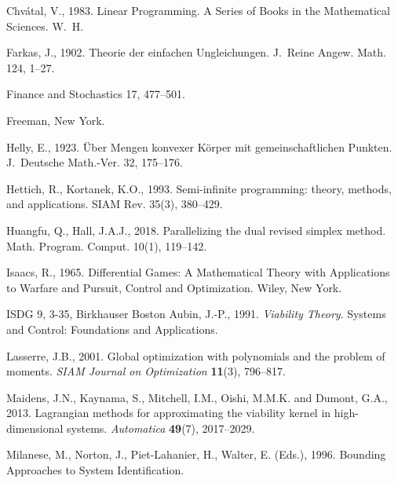 \documentclass[10pt,twocolumn]{article}
\theoremstyle{plain}
\theoremstyle{definition}
\theoremstyle{remark}
\begin{document}
Chv\'{a}tal, V., 1983. Linear Programming. A Series of Books in the
Mathematical Sciences. W.~H.

Farkas, J., 1902. Theorie der einfachen Ungleichungen. J.\ Reine Angew.
Math. 124, 1--27.

Finance and Stochastics 17, 477--501.

Freeman, New York.

Helly, E., 1923. \"Uber Mengen konvexer K\"orper mit gemeinschaftlichen
Punkten. J.~Deutsche Math.-Ver. 32, 175--176.

Hettich, R., Kortanek, K.O., 1993. Semi-infinite programming: theory,
methods, and applications. SIAM Rev. 35(3), 380--429.

Huangfu, Q., Hall, J.A.J., 2018. Parallelizing the dual revised simplex
method. Math. Program. Comput. 10(1), 119--142.

Isaacs, R., 1965. Differential Games: A Mathematical Theory with
Applications to Warfare and Pursuit, Control and Optimization. Wiley,
New York.

ISDG 9, 3-35, Birkhauser Boston
Aubin, J.-P., 1991. \emph{Viability Theory}. Systems and Control: Foundations and
Applications.

Lasserre, J.B., 2001. Global optimization with polynomials and the problem of moments.
\emph{SIAM Journal on Optimization} \textbf{11}(3), 796--817.

Maidens, J.N., Kaynama, S., Mitchell, I.M., Oishi, M.M.K. and Dumont, G.A., 2013. Lagrangian
methods for approximating the viability kernel in high-dimensional systems. \emph{Automatica}
\textbf{49}(7), 2017--2029.

Milanese, M., Norton, J., Piet-Lahanier, H., Walter, E. (Eds.), 1996.
Bounding Approaches to System Identification.
\end{document}
